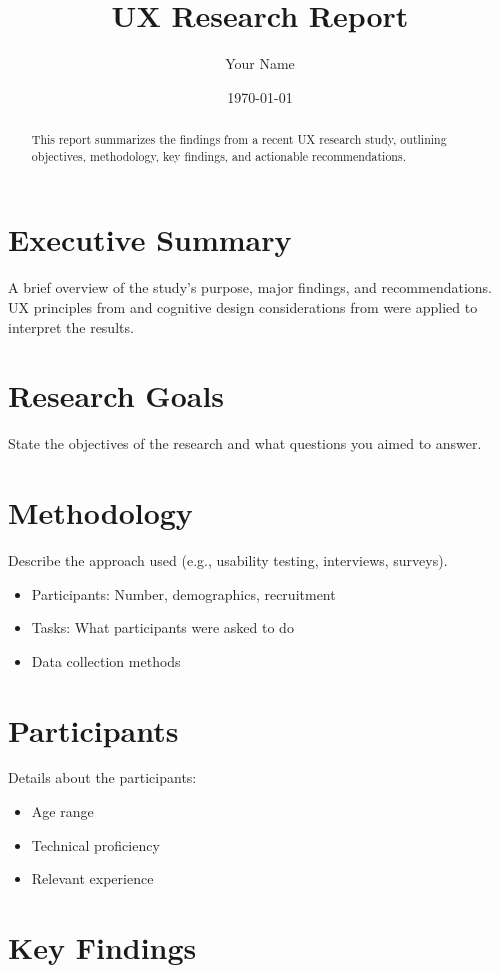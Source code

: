 \documentclass[12pt]{article}
\title{UX Research Report}
\author{Your Name}
\date{\today}
\begin{document}
\maketitle

\begin{abstract}
This report summarizes the findings from a recent UX research study, outlining objectives, methodology, key findings, and actionable recommendations.
\end{abstract}

\section{Executive Summary}
A brief overview of the study’s purpose, major findings, and recommendations.
UX principles from \cite{nielsen1994} and cognitive design considerations from \cite{norman2013} were applied to interpret the results.

\section{Research Goals}
State the objectives of the research and what questions you aimed to answer.

\section{Methodology}
Describe the approach used (e.g., usability testing, interviews, surveys).
\begin{itemize}
    \item Participants: Number, demographics, recruitment
    \item Tasks: What participants were asked to do
    \item Data collection methods
\end{itemize}

\section{Participants}
Details about the participants:
\begin{itemize}
    \item Age range
    \item Technical proficiency
    \item Relevant experience
\end{itemize}

\section{Key Findings}
\end{document}
